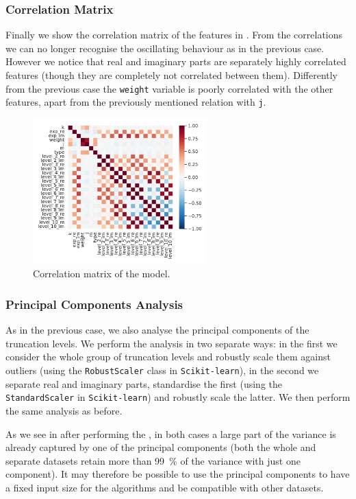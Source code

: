 \subsubsection{Correlation Matrix}

Finally we show the correlation matrix of the features in .
From the correlations we can no longer recognise the oscillating behaviour as in the previous case.
However we notice that real and imaginary parts are separately highly correlated features (though they are completely not correlated between them).
Differently from the previous case the \texttt{weight} variable is poorly correlated with the other features, apart from the previously mentioned relation with \texttt{j}.

\begin{figure}[htbp]
  \centering
  \includegraphics[width=0.6\textwidth]{img/wzw_corr_mat}
  \caption{Correlation matrix of the \wzw model.}
  \label{fig:wzw:corr}
\end{figure}


\subsubsection{Principal Components Analysis}

As in the previous case, we also analyse the principal components of the truncation levels.
We perform the analysis in two separate ways: in the first we consider the whole group of truncation levels and robustly scale them against outliers (using the \texttt{RobustScaler} class in \texttt{Scikit-learn}), in the second we separate real and imaginary parts, standardise the first (using the \texttt{StandardScaler} in \texttt{Scikit-learn}) and robustly scale the latter.
We then perform the same analysis as before.

As we see in  after performing the \svd, in both cases a large part of the variance is already captured by one of the principal components (both the whole and separate datasets retain more than \SI{99}{\percent} of the variance with just one component).
It may therefore be possible to use the principal components to have a fixed input size for the algorithms and be compatible with other datasets.

